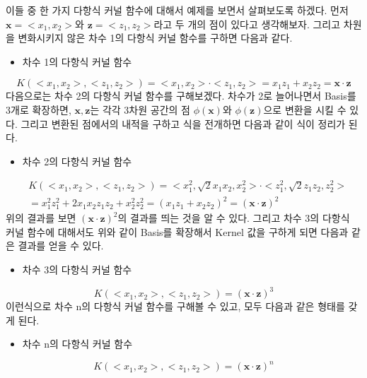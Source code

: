 \documentclass[a4paper]{oblivoir}
\begin{document}
\indent 이들 중 한 가지 다항식 커널 함수에 대해서 예제를 보면서 살펴보도록 하겠다. 먼저 $\mathbf{x}=<x_1,x_2>$와 $\mathbf{z}=<z_1,z_2>$라고 두 개의 점이 있다고 생각해보자. 그리고 차원을 변화시키지 않은 차수 1의 다항식 커널 함수를 구하면 다음과 같다.
\begin{itemize}\setlength\itemsep{-\parsep}
	\item 차수 1의 다항식 커널 함수
\end{itemize}
\begin{equation}
K(<x_1,x_2>,<z_1,z_2>)=<x_1,x_2>\cdot<z_1,z_2>=x_1z_1+x_2z_2=\mathbf{x\cdot z}
\label{eq:5-38}
\end{equation}
다음으로는 차수 2의 다항식 커널 함수를 구해보겠다. 차수가 2로 늘어나면서 Basis를 3개로 확장하면, $\mathbf{x,z}$는 각각 3차원 공간의 점 $\phi(\mathbf{x})$와 $\phi(\mathbf{z})$으로 변환을 시킬 수 있다. 그리고 변환된 점에서의 내적을 구하고 식을 전개하면 다음과 같이 식이 정리가 된다.
\begin{itemize}\setlength\itemsep{-\parsep}
	\item 차수 2의 다항식 커널 함수
\end{itemize}
\begin{equation}
\begin{split}
&K(<x_1,x_2>,<z_1,z_2>)=<x_1^2,\sqrt{2}x_1x_2,x_2^2>\cdot<z_1^2,\sqrt{2}z_1z_2,z_2^2>\\
&=x_1^2 z_1^2+2x_1 x_2z_1z_2+x_2^2z_2^2=(x_1z_1+x_2z_2)^2=(\mathbf{x\cdot z})^2
\end{split}
\label{eq:5-39}
\end{equation}
위의 결과를 보면 $(\mathbf{x\cdot z})^2$의 결과를 띄는 것을 알 수 있다. 그리고 차수 3의 다항식 커널 함수에 대해서도 위와 같이 Basis를 확장해서 Kernel 값을 구하게 되면 다음과 같은 결과를 얻을 수 있다.
\begin{itemize}\setlength\itemsep{-\parsep}
	\item 차수 3의 다항식 커널 함수
\end{itemize}
\begin{equation}
K(<x_1,x_2>,<z_1,z_2>)=(\mathbf{x\cdot z})^3
\label{eq:5-40}
\end{equation}
이런식으로 차수 n의 다항식 커널 함수를 구해볼 수 있고, 모두 다음과 같은 형태를 갖게 된다.
\begin{itemize}\setlength\itemsep{-\parsep}
	\item 차수 n의 다항식 커널 함수
\end{itemize}
\begin{equation}
K(<x_1,x_2>,<z_1,z_2>)=(\mathbf{x\cdot z})^n
\label{eq:5-41}
\end{equation}
\end{document}
